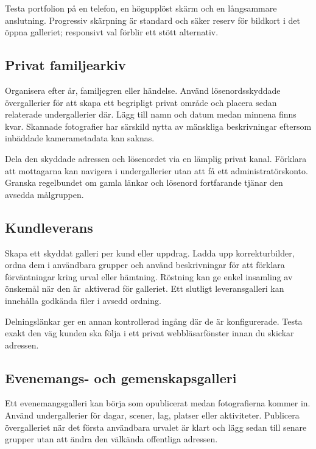 \documentclass[11pt,a4paper]{article}
\begin{document}
Testa portfolion på en telefon, en högupplöst skärm och en långsammare
anslutning. Progressiv skärpning är standard och säker reserv för bildkort i det
öppna galleriet; responsivt val förblir ett stött alternativ.

\subsection{Privat familjearkiv}

Organisera efter år, familjegren eller händelse. Använd lösenordsskyddade
övergallerier för att skapa ett begripligt privat område och placera sedan
relaterade undergallerier där. Lägg till namn och datum medan minnena finns
kvar. Skannade fotografier har särskild nytta av mänskliga beskrivningar
eftersom inbäddade kamerametadata kan saknas.

Dela den skyddade adressen och lösenordet via en lämplig privat kanal. Förklara
att mottagarna kan navigera i undergallerier utan att få ett
administratörskonto. Granska regelbundet om gamla länkar och lösenord
fortfarande tjänar den avsedda målgruppen.

\subsection{Kundleverans}

Skapa ett skyddat galleri per kund eller uppdrag. Ladda upp korrekturbilder,
ordna dem i användbara grupper och använd beskrivningar för att förklara
förväntningar kring urval eller hämtning. Röstning kan ge enkel insamling av
önskemål när den är~aktiverad för galleriet. Ett slutligt leveransgalleri kan
innehålla godkända filer i avsedd ordning.

Delningslänkar ger en annan kontrollerad ingång där de är konfigurerade. Testa
exakt den väg kunden ska följa i ett privat webbläsarfönster innan du skickar
adressen.

\subsection{Evenemangs- och gemenskapsgalleri}

Ett evenemangsgalleri kan börja som opublicerat medan fotografierna kommer in.
Använd undergallerier för dagar, scener, lag, platser eller aktiviteter.
Publicera övergalleriet när det första användbara urvalet är klart och lägg
sedan till senare grupper utan att ändra den välkända offentliga adressen.
\end{document}
